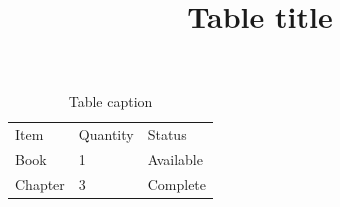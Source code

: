 \begin{table}[htbp]
	\title{Table title}
	\caption{Table caption}
	\label{table-label}

	\begin{center}
		\begin{tabular}{lll}
			Item    & Quantity & Status    \\
			Book    & 1        & Available \\
			Chapter & 3        & Complete  \\
		\end{tabular}
	\end{center}

\end{table}